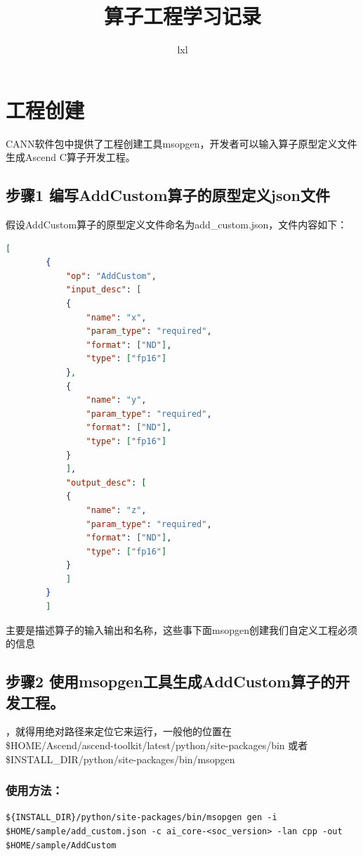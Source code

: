 \documentclass{article}
\title{算子工程学习记录}
\author{lxl}
\begin{document}
	
	\maketitle
	\newpage
	\section{工程创建}
	CANN软件包中提供了工程创建工具msopgen，开发者可以输入算子原型定义文件生成Ascend C算子开发工程。
	\subsection{步骤1 编写AddCustom算子的原型定义json文件}
	假设AddCustom算子的原型定义文件命名为add\_custom.json，文件内容如下：
	
	
	\begin{lstlisting}[language=json]
		[
		{
			"op": "AddCustom",
			"input_desc": [
			{
				"name": "x",
				"param_type": "required",
				"format": ["ND"],
				"type": ["fp16"]
			},
			{
				"name": "y",
				"param_type": "required",
				"format": ["ND"],
				"type": ["fp16"]
			}
			],
			"output_desc": [
			{
				"name": "z",
				"param_type": "required",
				"format": ["ND"],
				"type": ["fp16"]
			}
			]
		}
		]
	\end{lstlisting}
	主要是描述算子的输入输出和名称，这些事下面msopgen创建我们自定义工程必须的信息
    \newpage
    \subsection{步骤2 使用msopgen工具生成AddCustom算子的开发工程。}
    ，就得用绝对路径来定位它来运行，一般他的位置在\\ \$HOME/Ascend/ascend-toolkit/latest/python/site-packages/bin
    或者\\\${INSTALL\_DIR}/python/site-packages/bin/msopgen
    \subsubsection{使用方法：}
    \texttt{\$\{INSTALL\_DIR\}/python/site-packages/bin/msopgen gen -i \$HOME/sample/add\_custom.json -c ai\_core-<soc\_version> -lan cpp -out \$HOME/sample/AddCustom}
    
\end{document}
